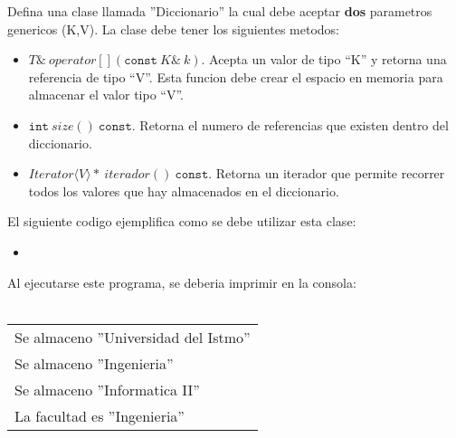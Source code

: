\documentclass{article}
\newcommand{\perlscript}[2]{
\begin{itemize}
\item[]
\end{itemize}
}
\begin{document}
Defina una clase llamada ''Diccionario'' la cual debe aceptar {\bf dos} parametros genericos (K,V).
La clase debe tener los siguientes metodos:
\begin{itemize}
        \item{$T\&\ operator[](\mathtt{const}\ K\&\ k)$. Acepta un valor de tipo ``K'' y retorna
        una referencia de tipo ``V''. Esta funcion debe crear el espacio en memoria para almacenar
        el valor tipo ``V''.}
        \item{$\mathtt{int}\ size()\ \mathtt{const}$. Retorna el numero de referencias que
        existen dentro del diccionario.}
        \item{$Iterator\langle V\rangle*\ iterador()\ \mathtt{const}$. Retorna un iterador que permite
        recorrer todos los valores que hay almacenados en el diccionario.}
\end{itemize}
El siguiente codigo ejemplifica como se debe utilizar esta clase:
\perlscript{dict.cc}{}
Al ejecutarse este programa, se deberia imprimir en la consola:
\\\\
\begin{center}
\begin{tabular}{|l|}
        \hline
        Se almaceno ''Universidad del Istmo'' \\
        Se almaceno ''Ingenieria'' \\
        Se almaceno ''Informatica II'' \\
        La facultad es ''Ingenieria'' \\
        \hline
\end{tabular}
\end{center}
\end{document}

